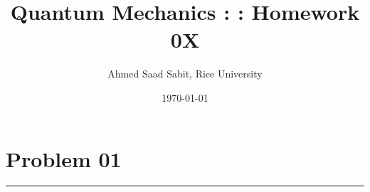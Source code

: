 \documentclass[letter, 10pts]{article}
\title{Quantum Mechanics : : Homework 0X}
\author{Ahmed Saad Sabit, Rice University}
\date{\today}
\begin{document}
\maketitle

























\section*{Problem 01} 
\hrule
\end{document}
